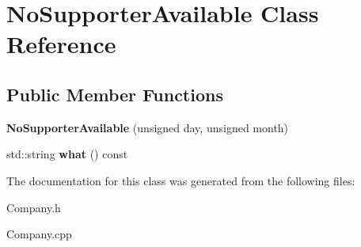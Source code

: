 \hypertarget{class_no_supporter_available}{}\section{No\+Supporter\+Available Class Reference}
\label{class_no_supporter_available}
\subsection*{Public Member Functions}
\begin{DoxyCompactItemize}
\item 
\mbox{\label{class_no_supporter_available_a9ae24112521420a3415c1479dbb66489}} 
{\bfseries No\+Supporter\+Available} (unsigned day, unsigned month)
\item 
\mbox{\label{class_no_supporter_available_a5b60aaf2c8a93091e454bcd7637e4391}} 
std\+::string {\bfseries what} () const
\end{DoxyCompactItemize}


The documentation for this class was generated from the following files\+:\begin{DoxyCompactItemize}
\item 
Company.\+h\item 
Company.\+cpp\end{DoxyCompactItemize}
